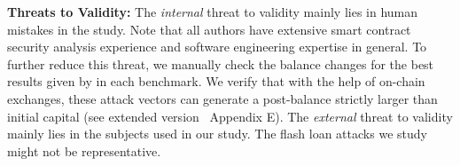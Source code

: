 \noindent
\textbf{Threats to Validity:}
The \textit{internal} threat to validity mainly lies in human mistakes in the
study. 
Note that all authors have extensive smart
contract security analysis experience and software engineering expertise in
general. To further reduce this threat, we manually check the balance changes
for the best results given by {\name} in each benchmark. We verify that with
the help of on-chain exchanges, these attack vectors can generate a
post-balance strictly larger than initial capital (see extended
version~\cite{chen2022flashsynArxiv} Appendix E). 
The \textit{external} threat to validity mainly lies in the subjects used in
our study. The flash loan attacks we study might not be representative.


\noindent
{}



